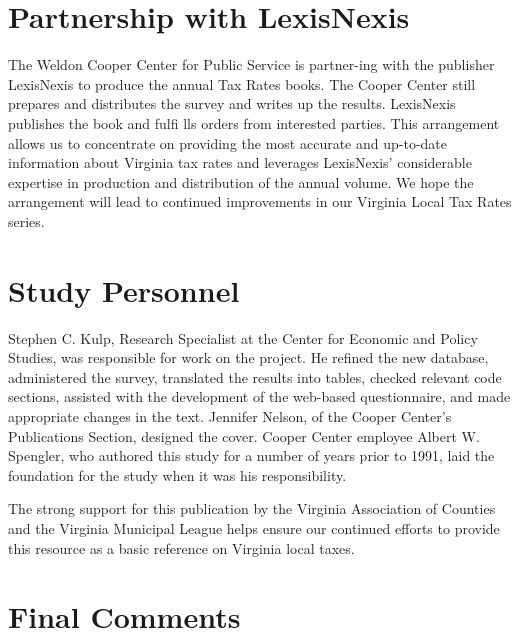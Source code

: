 \documentclass[
]{book}
\begin{document}
\hypertarget{partnership-with-lexisnexis}{%
\section*{Partnership with LexisNexis}\label{partnership-with-lexisnexis}}

The Weldon Cooper Center for Public Service is partner-ing with the publisher LexisNexis to produce the annual Tax Rates books. The Cooper Center still prepares and distributes the survey and writes up the results. LexisNexis publishes the book and fulfi lls orders from interested parties. This arrangement allows us to concentrate on providing the most accurate and up-to-date information about Virginia tax rates and leverages LexisNexis' considerable expertise in production and distribution of the annual volume. We hope the arrangement will lead to continued improvements in our Virginia Local Tax Rates series.

\hypertarget{study-personnel}{%
\section*{Study Personnel}\label{study-personnel}}

Stephen C. Kulp, Research Specialist at the Center for Economic and Policy Studies, was responsible for work on the project. He refined the new database, administered the survey, translated the results into tables, checked relevant code sections, assisted with the development of the web-based questionnaire, and made appropriate changes in the text. Jennifer Nelson, of the Cooper Center's Publications Section, designed the cover. Cooper Center employee Albert W. Spengler, who authored this study for a number of years prior to 1991, laid the foundation for the study when it was his responsibility.

The strong support for this publication by the Virginia Association of Counties and the Virginia Municipal League helps ensure our continued efforts to provide this resource as a basic reference on Virginia local taxes.

\hypertarget{final-comments}{%
\section*{Final Comments}\label{final-comments}}
\end{document}
